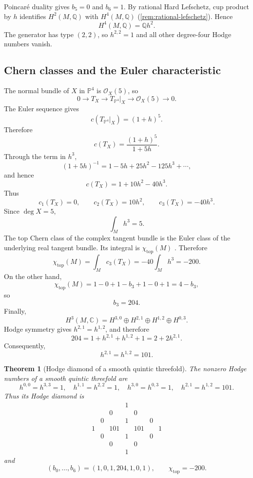 \documentclass[11pt,reqno]{amsart}
\newtheorem{theorem}{Theorem}[section]
\theoremstyle{definition}
\theoremstyle{remark}
\newcommand{\C}{\mathbb{C}}
\newcommand{\Q}{\mathbb{Q}}
\newcommand{\PP}{\mathbb{P}}
\newcommand{\OO}{\mathcal{O}}
\begin{document}
Poincar\'e duality gives $b_5=0$ and $b_6=1$. By rational Hard Lefschetz,
cup product by $h$ identifies $H^2(M,\Q)$ with $H^4(M,\Q)$
(\cref{rem:rational-lefschetz}). Hence
\[
H^4(M,\Q)=\Q h^2.
\]
The generator has type $(2,2)$, so $h^{2,2}=1$ and all other
degree-four Hodge numbers vanish.

\subsection{Chern classes and the Euler characteristic}

The normal bundle of $X$ in $\PP^4$ is $\OO_X(5)$, so
\[
0\longrightarrow T_X
\longrightarrow T_{\PP^4}|_X
\longrightarrow\OO_X(5)
\longrightarrow0.
\]
The Euler sequence gives
\[
c(T_{\PP^4}|_X)=(1+h)^5.
\]
Therefore
\[
c(T_X)=\frac{(1+h)^5}{1+5h}.
\]
Through the term in $h^3$,
\[
(1+5h)^{-1}=1-5h+25h^2-125h^3+\cdots,
\]
and hence
\[
c(T_X)=1+10h^2-40h^3.
\]
Thus
\[
c_1(T_X)=0,
\qquad
c_2(T_X)=10h^2,
\qquad
c_3(T_X)=-40h^3.
\]
Since $\deg X=5$,
\[
\int_M h^3=5.
\]
The top Chern class of the complex tangent bundle is the Euler class
of the underlying real tangent bundle. Its integral is
$\chi_{\mathrm{top}}(M)$
\cite[Cor.~11.12 and \S14]{milnorstasheff1974}. Therefore
\[
\chi_{\mathrm{top}}(M)
=\int_M c_3(T_X)
=-40\int_M h^3
=-200.
\]
On the other hand,
\[
\chi_{\mathrm{top}}(M)
=1-0+1-b_3+1-0+1
=4-b_3,
\]
so
\[
b_3=204.
\]
Finally,
\[
H^3(M,\C)
=H^{3,0}\oplus H^{2,1}\oplus H^{1,2}\oplus H^{0,3}.
\]
Hodge symmetry gives $h^{2,1}=h^{1,2}$, and therefore
\[
204=1+h^{2,1}+h^{1,2}+1
=2+2h^{2,1}.
\]
Consequently,
\[
\boxed{h^{2,1}=h^{1,2}=101}.
\]

\begin{theorem}[Hodge diamond of a smooth quintic threefold]
\label{thm:quintic}
The nonzero Hodge numbers of a smooth quintic threefold are
\[
h^{0,0}=h^{3,3}=1,
\quad
h^{1,1}=h^{2,2}=1,
\quad
h^{3,0}=h^{0,3}=1,
\quad
h^{2,1}=h^{1,2}=101.
\]
Thus its Hodge diamond is
\[
\begin{array}{ccccccc}
&&&1&&&\\[2pt]
&&0&&0&&\\[2pt]
&0&&1&&0&\\[2pt]
1&&101&&101&&1\\[2pt]
&0&&1&&0&\\[2pt]
&&0&&0&&\\[2pt]
&&&1&&&
\end{array}
\]
and
\[
(b_0,\dots,b_6)=(1,0,1,204,1,0,1),
\qquad
\chi_{\mathrm{top}}=-200.
\]
\end{theorem}
\end{document}
